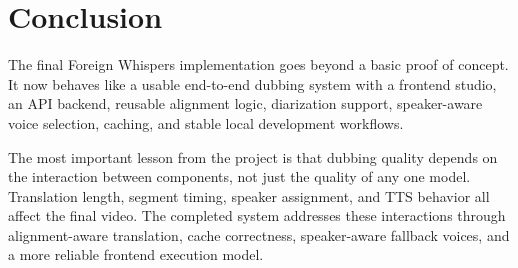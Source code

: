 \documentclass[11pt]{article}
\begin{document}
\section{Conclusion}
The final Foreign Whispers implementation goes beyond a basic proof of concept.
It now behaves like a usable end-to-end dubbing system with a frontend studio,
an API backend, reusable alignment logic, diarization support, speaker-aware
voice selection, caching, and stable local development workflows.

The most important lesson from the project is that dubbing quality depends on
the interaction between components, not just the quality of any one model.
Translation length, segment timing, speaker assignment, and TTS behavior all
affect the final video. The completed system addresses these interactions
through alignment-aware translation, cache correctness, speaker-aware fallback
voices, and a more reliable frontend execution model.
\end{document}
